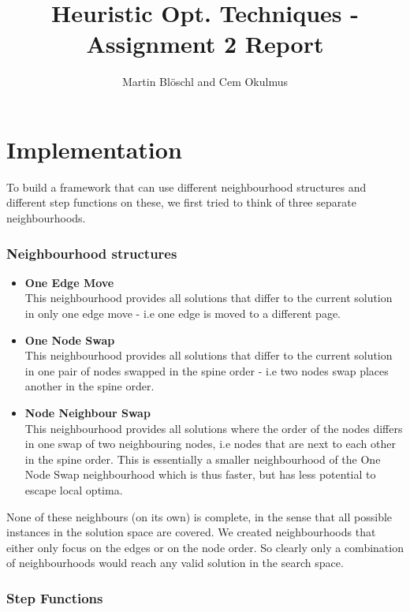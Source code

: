 \documentclass [11pt]{article}
\begin{document}
\title{ Heuristic Opt. Techniques - Assignment 2 Report}
\author{ Martin Blöschl and Cem Okulmus }

\maketitle
\thispagestyle{empty}


\section{Implementation}
To build a framework that can use different neighbourhood structures and different step functions on these, we first tried to think of three separate neighbourhoods. 

\subsubsection{Neighbourhood structures}

\begin{itemize}
  \item \textbf{One Edge Move} \\
  This neighbourhood provides all solutions that differ to the current solution in only one edge move - i.e one edge is moved to a different page.
  \item \textbf{One Node Swap} \\ 
  This neighbourhood provides all solutions that differ to the current solution in one pair of nodes swapped in the spine order - i.e two nodes swap places another in the spine order.
  \item \textbf{Node Neighbour Swap} \\
  This neighbourhood provides all solutions where the order of the nodes differs in one swap of two neighbouring nodes, i.e nodes that are next to each other in the spine order.  
  This is essentially a smaller neighbourhood of the One Node Swap neighbourhood which is thus faster, but has less potential to escape local optima.
\end{itemize}

None of these neighbours (on its own) is complete, in the sense that all possible instances in the solution space are covered.  We created neighbourhoods that either only focus on the edges or on the node order. So clearly only a combination of neighbourhoods would reach any valid solution in the search space.


\subsubsection{Step Functions}
\end{document}
